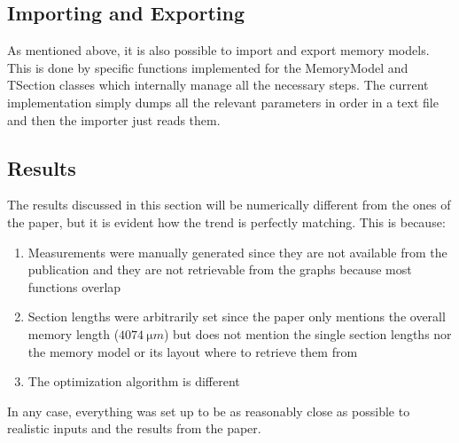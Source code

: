 \subsection{Importing and Exporting}
As mentioned above, it is also possible to import and export memory models. This is done by specific functions implemented for the MemoryModel and TSection classes which internally manage all the necessary steps. The current implementation simply dumps all the relevant parameters in order in a text file and then the importer just reads them.

\subsection{Results}
The results discussed in this section will be numerically different from the ones of the paper, but it is evident how the trend is perfectly matching. This is because:
\begin{enumerate}
    \item Measurements were manually generated since they are not available from the publication and they are not retrievable from the graphs because most functions overlap
    \item Section lengths were arbitrarily set since the paper only mentions the overall memory length ($\SI{4074}{\micro m}$) but does not mention the single section lengths nor the memory model or its layout where to retrieve them from
    \item The optimization algorithm is different
\end{enumerate}
In any case, everything was set up to be as reasonably close as possible to realistic inputs and the results from the paper.

